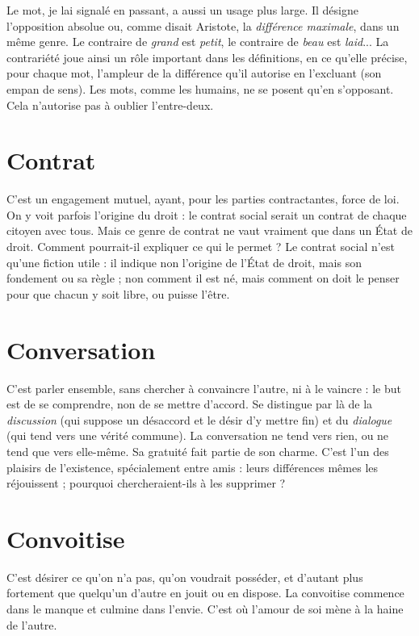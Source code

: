 Le mot, je lai signalé en passant, a aussi un usage plus large. Il désigne
l'opposition absolue ou, comme disait Aristote, la {\it différence maximale}, dans un
même genre. Le contraire de {\it grand} est {\it petit}, le contraire de {\it beau} est {\it laid}... La
contrariété joue ainsi un rôle important dans les définitions, en ce qu’elle précise,
pour chaque mot, l’ampleur de la différence qu’il autorise en l’excluant
(son empan de sens). Les mots, comme les humains, ne se posent qu’en s’opposant.
Cela n’autorise pas à oublier l’entre-deux.

\section{Contrat}
C'est un engagement mutuel, ayant, pour les parties contractantes,
force de loi. On y voit parfois l’origine du droit : le
contrat social serait un contrat de chaque citoyen avec tous. Mais ce genre de
contrat ne vaut vraiment que dans un État de droit. Comment pourrait-il
expliquer ce qui le permet ?
Le contrat social n’est qu’une fiction utile : il indique non l’origine de
l’État de droit, mais son fondement ou sa règle ; non comment il est né, mais
comment on doit le penser pour que chacun y soit libre, ou puisse l'être.

\section{Conversation}
C’est parler ensemble, sans chercher à convaincre l’autre,
ni à le vaincre : le but est de se comprendre, non de se
mettre d’accord. Se distingue par là de la {\it discussion} (qui suppose un désaccord et le
désir d’y mettre fin) et du {\it dialogue} (qui tend vers une vérité commune). La conversation
ne tend vers rien, ou ne tend que vers elle-même. Sa gratuité fait partie de
son charme. C’est l’un des plaisirs de l'existence, spécialement entre amis : leurs différences
mêmes les réjouissent ; pourquoi chercheraient-ils à les supprimer ?

\section{Convoitise}
C’est désirer ce qu’on n’a pas, qu’on voudrait posséder, et
d’autant plus fortement que quelqu'un d’autre en jouit ou
en dispose. La convoitise commence dans le manque et culmine dans l'envie.
C’est où l’amour de soi mène à la haine de l’autre.

